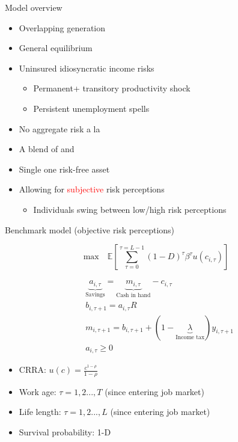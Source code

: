 \documentclass{beamer}
\begin{document}
\begin{frame}{Model overview}
	\begin{itemize}
		\item Overlapping generation 
		\item General equilibrium 

		\item Uninsured idiosyncratic income risks
		\begin{itemize}
		\item Permanent+ transitory productivity shock
		\item Persistent unemployment spells
		\end{itemize}
	\item No aggregate risk a la \cite{krusell1998income} 
		\item A blend of \cite{huggett1996wealth} and \cite{carroll1997buffer}
		\item Single one risk-free asset
	\item Allowing for \textcolor{red}{subjective} risk perceptions 
	\begin{itemize}
		\item Individuals swing between low/high risk perceptions
	\end{itemize}

	\end{itemize}
\end{frame}

\begin{frame}{Benchmark model (objective risk perceptions)}

\begin{equation*}
	\textrm{max}\quad  \mathbb{E}\left[\sum^{\tau=L-1}_{\tau=0}(1-D)^\tau\beta^\tau u(c_{i,\tau})\right] 
\end{equation*}



\begin{equation*}
	\begin{split}
		& \underbrace{a_{i,\tau}}_{\text{Savings}} = \underbrace{m_{i,\tau}}_{\text{Cash in hand}} - c_{i,\tau} \\
		& b_{i,\tau+1} = a_{i,\tau} R  \\
		& m_{i,\tau+1}   = b_{i,\tau+1}+(1-\underbrace{\lambda}_{\text{Income tax}})y_{i,\tau+1}\\
		& a_{i,\tau} \geq 0 
	\end{split}
\end{equation*}


\begin{itemize}
	\item CRRA: $u(c) = \frac{c^{1-\rho}}{1-\rho}$
	\item Work age: $\tau=1, 2...,T$ (since entering job market) 
	\item Life length: $\tau=1, 2...,L$  (since entering job market)
	\item Survival probability: 1-D
\end{itemize}

\end{frame}
\end{document}
